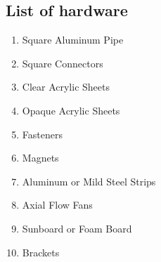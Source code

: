 \documentclass[a4paper,12pt,oneside]{book}
\begin{document}
\subsection{List of hardware}
  \begin{enumerate}
  \item Square Aluminum Pipe
  \item Square Connectors
  \item Clear Acrylic Sheets
  \item Opaque Acrylic Sheets
  \item Fasteners
  \item Magnets
  \item Aluminum or Mild Steel Strips
  \item Axial Flow Fans
  \item Sunboard or Foam Board
  \item Brackets
  \end{enumerate}
\end{document}
